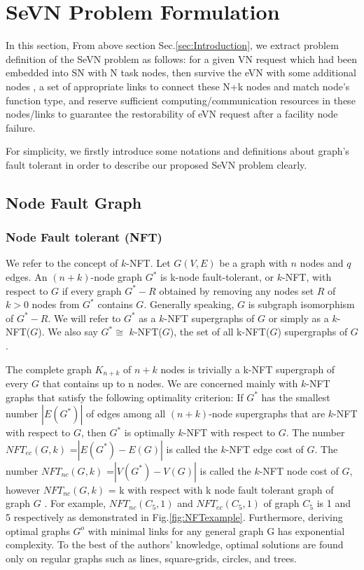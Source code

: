 
\section{SeVN Problem Formulation}
\label{sec:ProblemFormulation}

\cite{cui2016big}
In this section, From above section Sec.\ref{sec:Introduction}, we extract problem definition of the SeVN problem as follows: for a given VN request which had been embedded into SN with N task nodes, then survive the eVN with
some additional nodes , a set of appropriate links to connect these N+k nodes and match node's function type, and reserve sufficient computing/communication resources in these nodes/links to guarantee the restorability of eVN request after a facility node failure.

For simplicity, we firstly introduce some notations and definitions about graph's fault tolerant in order to describe our proposed SeVN problem clearly.

\subsection{Node Fault Graph}
\subsubsection{Node Fault tolerant (NFT)}
We refer to the concept of $k$-NFT\cite{harary1996node}. Let $G(V,E)$ be a graph with $n$ nodes and $q$ edges. An $(n+k)$-node graph $G^*$ is k-node fault-tolerant, or $k$-NFT, with respect to $G$ if every graph $G^*-R$ obtained by removing any nodes set $R$ of $k>0$ nodes from $G^*$ contains $G$. Generally speaking, $G$ is subgraph isomorphism of $G^*-R$. We will refer to $G^*$ as a $k$-NFT supergraphs of $G$ or simply as a $k$-NFT($G$). We also say $G^*\cong$ $k$-NFT($G$), the set of all k-NFT($G$) supergraphs of $G$.

The complete graph $K_{n+k}$ of $n + k$ nodes is trivially a k-NFT supergraph of every $G$ that contains up to n nodes. We are concerned mainly with $k$-NFT graphs that satisfy the following optimality criterion: If $G^*$ has the smallest number $|E(G^*)|$ of edges among all $(n + k)$-node supergraphs that are $k$-NFT with respect to $G$, then $G^*$ is optimally $k$-NFT with respect to $G$. The number $NFT_{ec}$$(G,k)$ =$|E(G^*)-E(G)|$ is called the $k$-NFT edge cost of $G$. The number $NFT_{nc}$$(G,k)$ =$|V(G^*)-V(G)|$ is called the $k$-NFT node cost of $G$, however $NFT_{nc}$$(G,k)$ = k with respect with k node fault tolerant graph of graph $G$ . For example, $NFT_{nc}$$(C_5,1)$ and $NFT_{ec}$$(C_5,1)$ of graph $C_5$ is 1 and 5 respectively as demonstrated in Fig.\ref{fig:NFTexample}. Furthermore, deriving optimal graphs $G^o$ with minimal links for any general graph G has exponential complexity. To the best of the authors’ knowledge, optimal solutions are found only on regular graphs such as lines, square-grids, circles, and trees.

